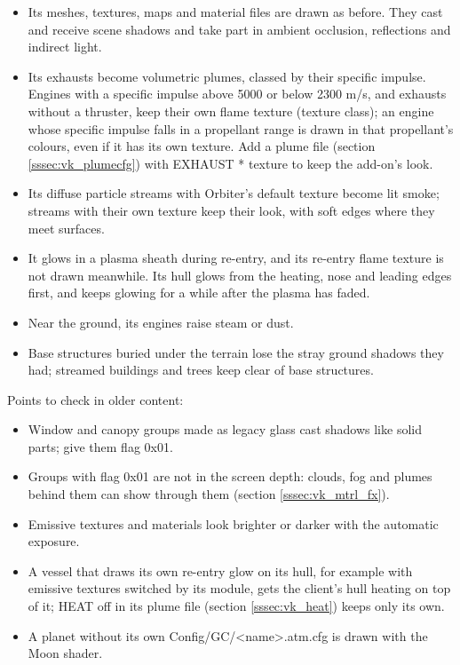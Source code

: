 \documentclass[Orbiter Developer Manual.tex]{subfiles}
\begin{document}
\begin{sloppypar}
\begin{itemize}
\item Its meshes, textures, maps and material files are drawn as before. They cast and receive scene shadows and take part in ambient occlusion, reflections and indirect light.
\item Its exhausts become volumetric plumes, classed by their specific impulse. Engines with a specific impulse above 5000 or below 2300 m/s, and exhausts without a thruster, keep their own flame texture (texture class); an engine whose specific impulse falls in a propellant range is drawn in that propellant's colours, even if it has its own texture. Add a plume file (section \ref{sssec:vk_plumecfg}) with EXHAUST * texture to keep the add-on's look.
\item Its diffuse particle streams with Orbiter's default texture become lit smoke; streams with their own texture keep their look, with soft edges where they meet surfaces.
\item It glows in a plasma sheath during re-entry, and its re-entry flame texture is not drawn meanwhile. Its hull glows from the heating, nose and leading edges first, and keeps glowing for a while after the plasma has faded.
\item Near the ground, its engines raise steam or dust.
\item Base structures buried under the terrain lose the stray ground shadows they had; streamed buildings and trees keep clear of base structures.
\end{itemize}

\noindent
Points to check in older content:

\begin{itemize}
\item Window and canopy groups made as legacy glass cast shadows like solid parts; give them flag 0x01.
\item Groups with flag 0x01 are not in the screen depth: clouds, fog and plumes behind them can show through them (section \ref{sssec:vk_mtrl_fx}).
\item Emissive textures and materials look brighter or darker with the automatic exposure.
\item A vessel that draws its own re-entry glow on its hull, for example with emissive textures switched by its module, gets the client's hull heating on top of it; HEAT off in its plume file (section \ref{sssec:vk_heat}) keeps only its own.
\item A planet without its own Config/GC/<name>.atm.cfg is drawn with the Moon shader.
\end{itemize}



\end{sloppypar}
\end{document}
